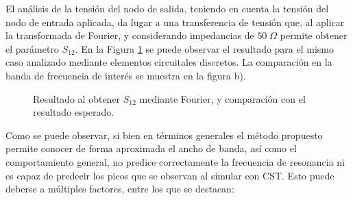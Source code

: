 El análisis de la tensión del nodo de salida, teniendo en cuenta la tensión del nodo de entrada aplicada, da lugar a una transferencia de tensión que, al aplicar la transformada de Fourier, y considerando impedancias de $50 \; \Omega$ permite obtener el parámetro $S_{12}$. En la Figura \ref{fig:resultado_s12_tlm} se puede observar el resultado para el mismo caso analizado mediante elementos circuitales discretos. La comparación en la banda de frecuencia de interés se muestra en la figura b).

\begin{figure}[htp]
	\centering 
	\hspace{0pt}
	\caption{Resultado al obtener $S_{12}$ mediante Fourier, y comparación con el resultado esperado.}
	\label{fig:resultado_s12_tlm}
\end{figure}

Como se puede observar, si bien en términos generales el método propuesto permite conocer de forma aproximada el ancho de banda, así como el comportamiento general, no predice correctamente la frecuencia de resonancia ni es capaz de predecir los picos que se observan al simular con CST. Esto puede deberse a múltiples factores, entre los que se destacan:

